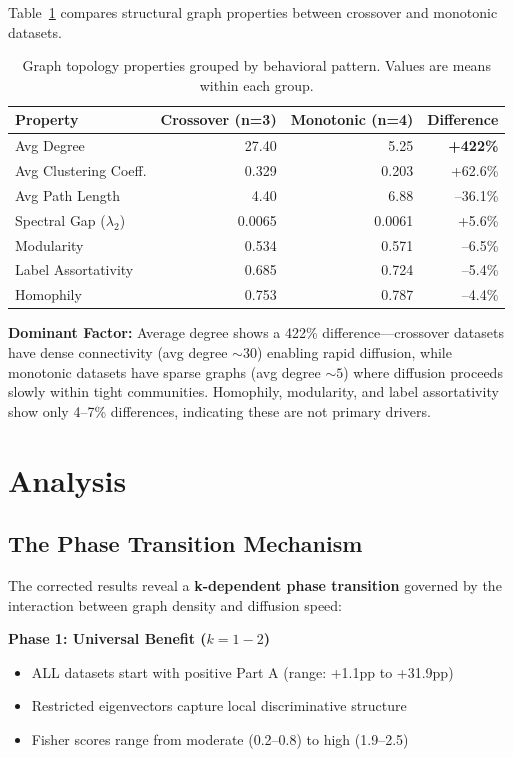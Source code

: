 \documentclass[11pt]{article}
\begin{document}
Table~\ref{tab:graph_properties} compares structural graph properties between crossover and monotonic datasets.

\begin{table}[h]
\centering
\caption{Graph topology properties grouped by behavioral pattern. Values are means within each group.}
\label{tab:graph_properties}
\begin{tabular}{lrrr}
\toprule
\textbf{Property} & \textbf{Crossover (n=3)} & \textbf{Monotonic (n=4)} & \textbf{Difference} \\
\midrule
Avg Degree            & 27.40 & 5.25  & \textbf{+422\%} \\
Avg Clustering Coeff. & 0.329 & 0.203 & +62.6\% \\
Avg Path Length       & 4.40  & 6.88  & --36.1\% \\
Spectral Gap ($\lambda_2$) & 0.0065 & 0.0061 & +5.6\% \\
Modularity            & 0.534 & 0.571 & --6.5\% \\
Label Assortativity   & 0.685 & 0.724 & --5.4\% \\
Homophily             & 0.753 & 0.787 & --4.4\% \\
\bottomrule
\end{tabular}
\end{table}

\textbf{Dominant Factor:} Average degree shows a 422\% difference—crossover datasets have dense connectivity (avg degree ${\sim}30$) enabling rapid diffusion, while monotonic datasets have sparse graphs (avg degree ${\sim}5$) where diffusion proceeds slowly within tight communities. Homophily, modularity, and label assortativity show only 4--7\% differences, indicating these are not primary drivers.

\section{Analysis}

\subsection{The Phase Transition Mechanism}

The corrected results reveal a \textbf{k-dependent phase transition} governed by the interaction between graph density and diffusion speed:

\textbf{Phase 1: Universal Benefit ($k{=}1{-}2$)}
\begin{itemize}
\item ALL datasets start with positive Part A (range: +1.1pp to +31.9pp)
\item Restricted eigenvectors capture local discriminative structure
\item Fisher scores range from moderate (0.2--0.8) to high (1.9--2.5)
\end{itemize}
\end{document}
